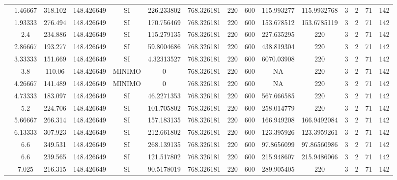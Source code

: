 \begin{table}[H]
{\begin{tabular}{|c|c|c|c|c|c|c|c|c|c|c|c|c|c|c|}
\cline{2-15}    & 1.46667 & 318.102 & 148.426649 & SI  & 226.233802 & 768.326181 & 220 & 600 & 115.993277 & 115.9932768 & 3   & 2   & 71  & 142 \bigstrut\\
\cline{2-15}    & 1.93333 & 276.494 & 148.426649 & SI  & 170.756469 & 768.326181 & 220 & 600 & 153.678512 & 153.6785119 & 3   & 2   & 71  & 142 \bigstrut\\
\cline{2-15}    & 2.4 & 234.886 & 148.426649 & SI  & 115.279135 & 768.326181 & 220 & 600 & 227.635295 & 220 & 3   & 2   & 71  & 142 \bigstrut\\
\cline{2-15}    & 2.86667 & 193.277 & 148.426649 & SI  & 59.8004686 & 768.326181 & 220 & 600 & 438.819304 & 220 & 3   & 2   & 71  & 142 \bigstrut\\
\cline{2-15}    & 3.33333 & 151.669 & 148.426649 & SI  & 4.32313527 & 768.326181 & 220 & 600 & 6070.03908 & 220 & 3   & 2   & 71  & 142 \bigstrut\\
\cline{2-15}    & 3.8 & 110.06 & 148.426649 & MINIMO & 0   & 768.326181 & 220 & 600 & NA  & 220 & 3   & 2   & 71  & 142 \bigstrut\\
\cline{2-15}    & 4.26667 & 141.489 & 148.426649 & MINIMO & 0   & 768.326181 & 220 & 600 & NA  & 220 & 3   & 2   & 71  & 142 \bigstrut\\
\cline{2-15}    & 4.73333 & 183.097 & 148.426649 & SI  & 46.2271353 & 768.326181 & 220 & 600 & 567.666585 & 220 & 3   & 2   & 71  & 142 \bigstrut\\
\cline{2-15}    & 5.2 & 224.706 & 148.426649 & SI  & 101.705802 & 768.326181 & 220 & 600 & 258.014779 & 220 & 3   & 2   & 71  & 142 \bigstrut\\
\cline{2-15}    & 5.66667 & 266.314 & 148.426649 & SI  & 157.183135 & 768.326181 & 220 & 600 & 166.949208 & 166.9492084 & 3   & 2   & 71  & 142 \bigstrut\\
\cline{2-15}    & 6.13333 & 307.923 & 148.426649 & SI  & 212.661802 & 768.326181 & 220 & 600 & 123.395926 & 123.3959261 & 3   & 2   & 71  & 142 \bigstrut\\
\cline{2-15}    & 6.6 & 349.531 & 148.426649 & SI  & 268.139135 & 768.326181 & 220 & 600 & 97.8656099 & 97.86560986 & 3   & 2   & 71  & 142 \bigstrut\\
\cline{2-15}    & 6.6 & 239.565 & 148.426649 & SI  & 121.517802 & 768.326181 & 220 & 600 & 215.948607 & 215.9486066 & 3   & 2   & 71  & 142 \bigstrut\\
\cline{2-15}    & 7.025 & 216.315 & 148.426649 & SI  & 90.5178019 & 768.326181 & 220 & 600 & 289.905405 & 220 & 3   & 2   & 71  & 142 \bigstrut\\

\end{tabular}}
\end{table}
